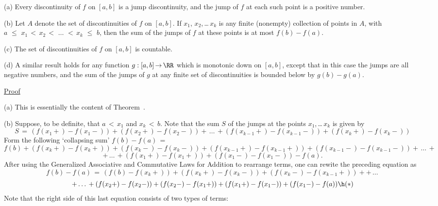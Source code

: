 \V

        (a) Every discontinuity of $f$ on $[a,b]$ is a jump discontinuity, and the jump of $f$ at each such point is a positive number.

\V

        (b) Let $A$ denote the set of discontinuities of $f$ on $[a,b]$. If $x_{1}$, $x_{2}$,\,{\ldots}\,$x_{k}$ is any finite (nonempty) collection of points in $A$, with $a\,\,{\leq}\,\,x_{1}\,<\,x_{2}\,<\,\,{\ldots}\,\,<\,x_{k}\,\,{\leq}\,\,b$, then the sum of the jumps of $f$ at these points is at most $f(b)-f(a)$.

\V

        (c) The set of discontinuities of $f$ on $[a,b]$ is countable.

\V

        (d) A similar result holds for any function $g:[a,b] \,{\rightarrow}\, {\RR}$ which is monotonic down on $[a,b]$,
    except that in this case the jumps are all negative numbers, and the sum of the jumps of $g$ at any finite set of discontinuities is bounded below by $g(b)-g(a)$.

\V

        \underline{Proof}

\V

        (a) This is essentially the content of Theorem~.

\V

        (b) Suppose, to be definite, that $a\,<\,x_{1}$ and $x_{k}\,<\,b$. Note that the sum $S$ of the jumps at the points $x_{1}$,\,{\ldots}\,$x_{k}$ is given by
        \begin{displaymath}
        S \,=\, (f(x_{1}+)-f(x_{1}-)) + (f(x_{2}+)-f(x_{2}-)) + \,{\ldots}\, +
    (f(x_{k-1}+)-f(x_{k-1}-)) + (f(x_{k}+)-f(x_{k}-))
        \end{displaymath}
    Form the following `collapsing sum'  $f(b)-f(a) \,=\, $
        \begin{displaymath}
        f(b) + (f(x_{k}+)-f(x_{k}+)) + (f(x_{k}-)-f(x_{k}-)) +
    (f(x_{k-1}+)-f(x_{k-1}+)) + (f(x_{k-1}-)-f(x_{k-1}-)) + \,{\ldots}\, +
        \end{displaymath}
        \begin{displaymath}
    + \,{\ldots}\, +(f(x_{1}+)-f(x_{1}+)) + (f(x_{1}-)-f(x_{1}-)) - f(a).
        \end{displaymath}
    After using the Generalized Associative and Commutative Laws for Addition to rearrange terms, one can rewite the preceding equation as 
        \begin{displaymath}
    f(b)-f(a) \,=\, (f(b)-f(x_{k}+)) + (f(x_{k}+)-f(x_{k}-)) + (f(x_{k}-)-f(x_{k-1}+)) +  +\,{\ldots}\, 
        \end{displaymath}
        \begin{displaymath}
      + \,{\ldots}\, +(f(x_{2}+)-f(x_{2}-)) + (f(x_{2}-)-f(x_{1}+)) + (f(x_{1}+)-f(x_{1}-)) + (f(x_{1}-)-f(a)) \h ({\ast})
        \end{displaymath}
    Note that the right side of this last equation consists of two types of terms:

